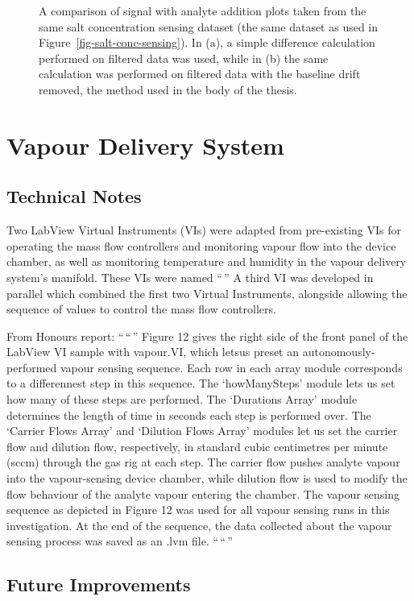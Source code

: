 \documentclass[
  a4paper,
]{scrbook}
\begin{document}
\begin{figure}
\begin{minipage}[t]{0.50\linewidth}
{{}

}

\subcaption{\label{fig-spaa-detrend}}
\end{minipage}%

\caption{\label{fig-spaa-plot-comparison}A comparison of signal with
analyte addition plots taken from the same salt concentration sensing
dataset (the same dataset as used in
Figure~\ref{fig-salt-conc-sensing}). In (a), a simple difference
calculation performed on filtered data was used, while in (b) the same
calculation was performed on filtered data with the baseline drift
removed, the method used in the body of the thesis.}

\end{figure}

\hypertarget{vapour-delivery-system}{%
\chapter{Vapour Delivery System}\label{vapour-delivery-system}}

\hypertarget{technical-notes}{%
\section{Technical Notes}\label{technical-notes}}

Two LabView Virtual Instruments (VIs) were adapted from pre-existing VIs
for operating the mass flow controllers and monitoring vapour flow into
the device chamber, as well as monitoring temperature and humidity in
the vapour delivery system's manifold. These VIs were named ``\,'' A
third VI was developed in parallel which combined the first two Virtual
Instruments, alongside allowing the sequence of values to control the
mass flow controllers.

From Honours report: ``\,``\,'' Figure 12 gives the right side of the
front panel of the LabView VI sample with vapour.VI, which letsus preset
an autonomously-performed vapour sensing sequence. Each row in each
array module corresponds to a differennest step in this sequence. The
`howManySteps' module lets us set how many of these steps are performed.
The `Durations Array' module determines the length of time in seconds
each step is performed over. The `Carrier Flows Array' and `Dilution
Flows Array' modules let us set the carrier flow and dilution flow,
respectively, in standard cubic centimetres per minute (sccm) through
the gas rig at each step. The carrier flow pushes analyte vapour into
the vapour-sensing device chamber, while dilution flow is used to modify
the flow behaviour of the analyte vapour entering the chamber. The
vapour sensing sequence as depicted in Figure 12 was used for all vapour
sensing runs in this investigation. At the end of the sequence, the data
collected about the vapour sensing process was saved as an .lvm file.
``\,``\,''

\hypertarget{future-improvements}{%
\section{Future Improvements}\label{future-improvements}}


\backmatter
\printbibliography
\end{document}
